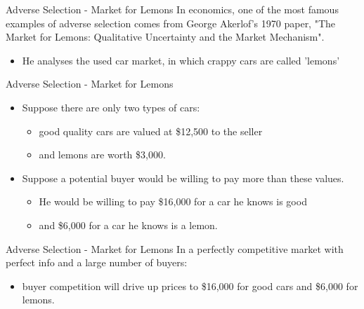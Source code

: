
\begin{frame}{Adverse Selection - Market for Lemons}
  In economics, one of the most famous examples of adverse selection 
  comes from George Akerlof's 1970 paper, 
  "The Market for Lemons: Qualitative Uncertainty and the Market Mechanism".
  \begin{itemize}
    \item He analyses the used car market, 
    in which crappy cars are called 'lemons'
  \end{itemize}
\end{frame}


\begin{frame}{Adverse Selection - Market for Lemons}
  \begin{itemize}
    \item Suppose there are only two types of cars:
    \begin{itemize}
      \item good quality cars are valued at \$12,500 to the seller
      \item and lemons are worth \$3,000. 
    \end{itemize}
    \item Suppose a potential buyer would be willing to pay more than these values. 
    \begin{itemize}
      \item He would be willing to pay \$16,000 for a car he knows is good
      \item and \$6,000 for a car he knows is a lemon.
    \end{itemize}
  \end{itemize}
\end{frame}


\begin{frame}{Adverse Selection - Market for Lemons}
  In a perfectly competitive market with perfect info
  and a large number of buyers:
  \begin{itemize}
    \item buyer competition will drive up prices to 
    \$16,000 for good cars and \$6,000 for lemons.
  \end{itemize}
\end{frame}

